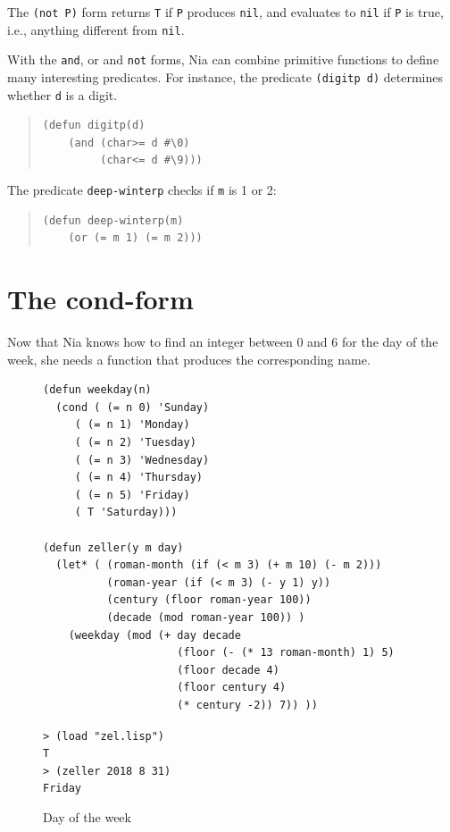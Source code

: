 \documentclass[a4paper,12pt]{book}
\newenvironment{fmpage}[1]
           {\begin{lrbox}{\fmbox}\begin{minipage}{#1}}
           {\end{minipage}\end{lrbox}\fbox{\usebox{\fmbox}}}
\begin{document}
The \verb|(not P)| form returns \verb|T|
if \verb|P| produces \verb|nil|, and
evaluates to \verb|nil| if \verb|P| is true,
i.e., anything different from \verb|nil|.

With the \verb|and|, or and \verb|not| forms, Nia can
combine primitive functions to define many interesting
predicates. For instance, the predicate \verb|(digitp d)|
determines whether \verb|d| is a digit.
\begin{quote}
\begin{verbatim}
(defun digitp(d)
    (and (char>= d #\0)
         (char<= d #\9)))
\end{verbatim}
\end{quote}
The predicate \verb|deep-winterp| checks if
\verb|m| is 1 or 2:
\begin{quote}
\begin{verbatim}
(defun deep-winterp(m)
    (or (= m 1) (= m 2)))
\end{verbatim}
\end{quote}


\section{The cond-form}\label{page:cond-form}
Now that Nia knows how to find
an integer between 0 and 6 for the 
day of the week, she needs a function
that produces the corresponding name.


\begin{figure}[!h]
\begin{fmpage}{\linewidth}
\begin{verbatim}
(defun weekday(n)
  (cond ( (= n 0) 'Sunday)
     ( (= n 1) 'Monday)
     ( (= n 2) 'Tuesday)
     ( (= n 3) 'Wednesday)
     ( (= n 4) 'Thursday)
     ( (= n 5) 'Friday)
     ( T 'Saturday)))

(defun zeller(y m day)
  (let* ( (roman-month (if (< m 3) (+ m 10) (- m 2)))
          (roman-year (if (< m 3) (- y 1) y))
          (century (floor roman-year 100))
          (decade (mod roman-year 100)) )
    (weekday (mod (+ day decade
                     (floor (- (* 13 roman-month) 1) 5)
                     (floor decade 4)
                     (floor century 4)
                     (* century -2)) 7)) ))
\end{verbatim}
\end{fmpage}

\begin{fmpage}{\linewidth}
\verb|> (load "zel.lisp")|\\
\verb|T|\\
\verb|> (zeller 2018 8 31)|\\
\verb|Friday|
\end{fmpage}
\caption{Day of the week}
\label{fig:day-of-the-week}
\end{figure}
\end{document}
